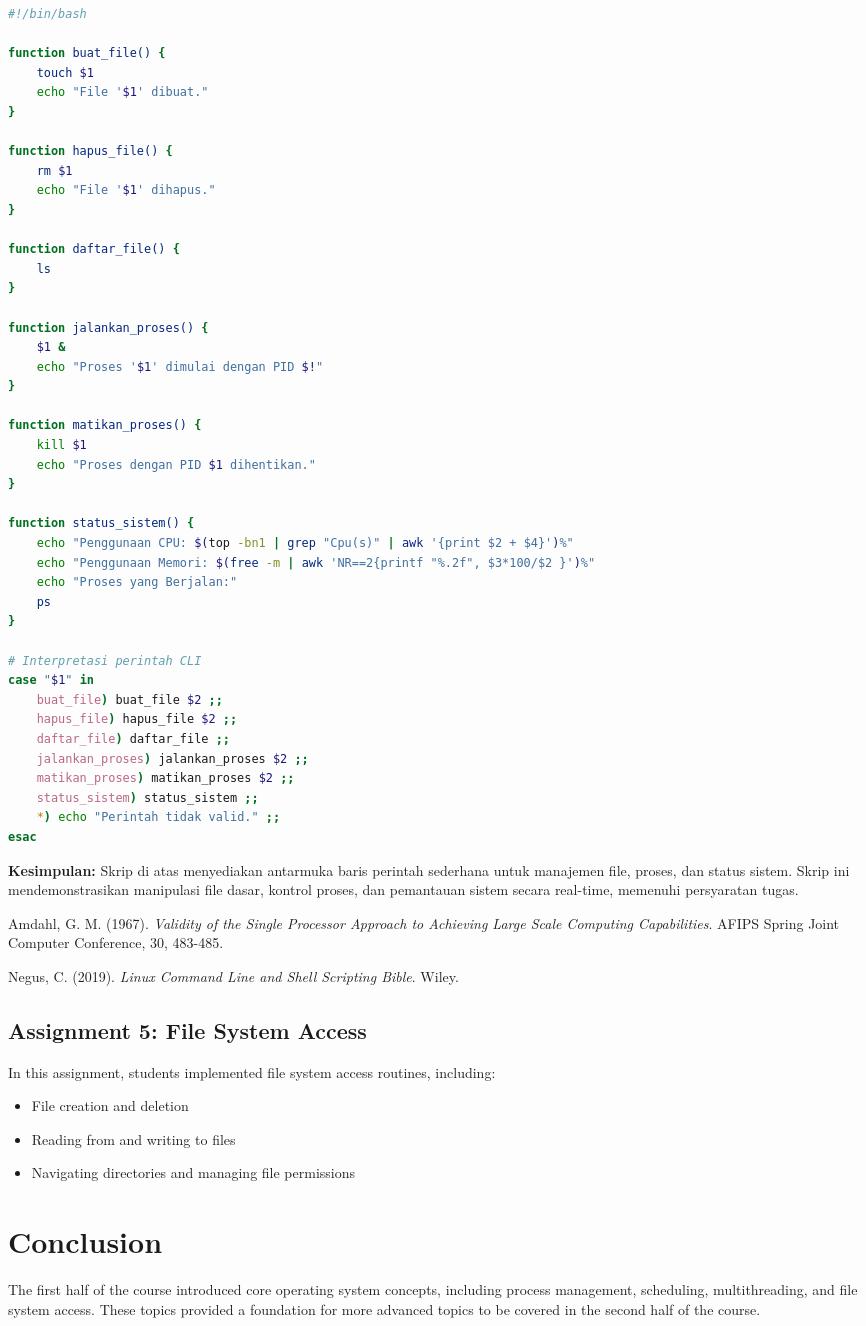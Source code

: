 \documentclass[12pt]{article}
\begin{document}
\begin{lstlisting}[language=bash, caption=Contoh skrip CLI sederhana]
#!/bin/bash

function buat_file() {
    touch $1
    echo "File '$1' dibuat."
}

function hapus_file() {
    rm $1
    echo "File '$1' dihapus."
}

function daftar_file() {
    ls
}

function jalankan_proses() {
    $1 &
    echo "Proses '$1' dimulai dengan PID $!"
}

function matikan_proses() {
    kill $1
    echo "Proses dengan PID $1 dihentikan."
}

function status_sistem() {
    echo "Penggunaan CPU: $(top -bn1 | grep "Cpu(s)" | awk '{print $2 + $4}')%"
    echo "Penggunaan Memori: $(free -m | awk 'NR==2{printf "%.2f", $3*100/$2 }')%"
    echo "Proses yang Berjalan:"
    ps
}

# Interpretasi perintah CLI
case "$1" in
    buat_file) buat_file $2 ;;
    hapus_file) hapus_file $2 ;;
    daftar_file) daftar_file ;;
    jalankan_proses) jalankan_proses $2 ;;
    matikan_proses) matikan_proses $2 ;;
    status_sistem) status_sistem ;;
    *) echo "Perintah tidak valid." ;;
esac
\end{lstlisting}

\textbf{Kesimpulan:}  
Skrip di atas menyediakan antarmuka baris perintah sederhana untuk manajemen file, proses, dan status sistem. Skrip ini mendemonstrasikan manipulasi file dasar, kontrol proses, dan pemantauan sistem secara real-time, memenuhi persyaratan tugas.

\begin{thebibliography}{9}

Amdahl, G. M. (1967). 
\textit{Validity of the Single Processor Approach to Achieving Large Scale Computing Capabilities}. 
AFIPS Spring Joint Computer Conference, 30, 483-485.

Negus, C. (2019). 
\textit{Linux Command Line and Shell Scripting Bible}. 
Wiley.

\end{thebibliography}

\subsection{Assignment 5: File System Access}
In this assignment, students implemented file system access routines, including:
\begin{itemize}
    \item File creation and deletion
    \item Reading from and writing to files
    \item Navigating directories and managing file permissions
\end{itemize}

\section{Conclusion}
The first half of the course introduced core operating system concepts, including process management, scheduling, multithreading, and file system access. These topics provided a foundation for more advanced topics to be covered in the second half of the course.
\end{document}
